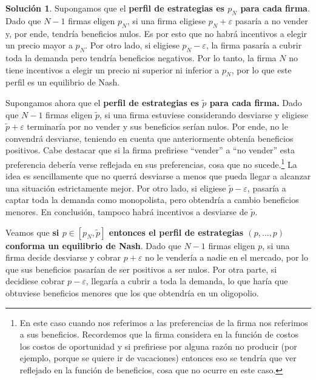 \documentclass[a4paper, 11pt]{article}
\theoremstyle{definition}
\newtheorem{solucion}{Soluci\'on}
\begin{document}
\begin{solucion}
\vspace{6pt}
Supongamos que el \textbf{perfil de estrategias es $p_N$ para cada firma}. Dado que $N-1$ firmas eligen $p_N$, si una firma eligiese $p_N+\varepsilon$ pasaría a no vender y, por ende, tendría beneficios nulos. Es por esto que no habrá incentivos a elegir un precio mayor a $p_N$. Por otro lado, si  eligiese $p_N-\varepsilon$, la firma pasaría a cubrir toda la demanda pero tendría beneficios negativos. Por lo tanto, la firma $N$ no tiene incentivos a elegir un precio ni superior ni inferior a $p_N$, por lo que este perfil es un equilibrio de Nash.

\vspace{12pt}
Supongamos ahora que el \textbf{perfil de estrategias es $\widetilde{p}$ para cada firma.} Dado que $N-1$ firmas eligen $\widetilde{p}$, si una firma estuviese considerando desviarse y eligiese $\widetilde{p}+\varepsilon$ terminaría por no vender y sus beneficios serían nulos. Por ende, no le convendrá desviarse, teniendo en cuenta que anteriormente obtenía beneficios positivos. Cabe destacar que si la firma prefiriese ``vender'' a ``no vender'' esta preferencia debería verse reflejada en sus preferencias, cosa que no sucede.\footnote{En este caso cuando nos referimos a las preferencias de la firma nos referimos a sus beneficios. Recordemos que la firma considera en la función de costos los costos de oportunidad y si prefiriese por alguna razón no producir (por ejemplo, porque se quiere ir de vacaciones) entonces eso se tendría que ver reflejado en la función de beneficios, cosa que no ocurre en este caso.} La idea es sencillamente que no querrá desviarse a menos que pueda llegar a alcanzar una situación estrictamente mejor. Por otro lado, si eligiese $\widetilde{p}-\varepsilon$, pasaría a captar toda la demanda como monopolista, pero obtendría a cambio beneficios menores. En conclusión, tampoco habrá incentivos a desviarse de $\widetilde{p}$.

\vspace{12pt}
Veamos que \textbf{si $p \in [p_N,\widetilde{p}]$ entonces el perfil de estrategias $(p,\dotsc , p)$ conforma un equilibrio de Nash}. Dado que $N-1$ firmas eligen $p$, si una firma decide desviarse y cobrar $p+\varepsilon$ no le vendería a nadie en el mercado, por lo que sus beneficios pasarían de ser positivos a ser nulos.  Por otra parte, si decidiese cobrar $p-\varepsilon$, llegaría a cubrir a toda la demanda, lo que haría que obtuviese beneficios menores que los que obtendría en un oligopolio.


\end{solucion}
\end{document}
